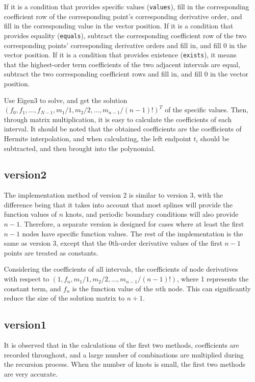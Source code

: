 \documentclass[a4paper]{article}
\begin{document}
If it is a condition that provides specific values (\texttt{values}), fill in the corresponding coefficient row of the corresponding point's corresponding derivative order, and fill in the corresponding value in the vector position. If it is a condition that provides equality (\texttt{equals}), subtract the corresponding coefficient row of the two corresponding points' corresponding derivative orders and fill in, and fill 0 in the vector position. If it is a condition that provides existence (\texttt{exists}), it means that the highest-order term coefficients of the two adjacent intervals are equal, subtract the two corresponding coefficient rows and fill in, and fill 0 in the vector position.

Use Eigen3 to solve, and get the solution \((f_0, f_1, \dots, f_{N-1}, m_1/1, m_2/2, \dots, m_{n-1}/(n-1)!)^T\) of the specific values. Then, through matrix multiplication, it is easy to calculate the coefficients of each interval. It should be noted that the obtained coefficients are the coefficients of Hermite interpolation, and when calculating, the left endpoint \(t_i\) should be subtracted, and then brought into the polynomial.

\subsection*{version2}

The implementation method of version 2 is similar to version 3, with the difference being that it takes into account that most splines will provide the function values of $n$ knots, and periodic boundary conditions will also provide $n-1$. Therefore, a separate version is designed for cases where at least the first $n-1$ nodes have specific function values. The rest of the implementation is the same as version 3, except that the 0th-order derivative values of the first $n-1$ points are treated as constants.

Considering the coefficients of all intervals, the coefficients of node derivatives with respect to $(1, f_n, m_1/1, m_2/2, \dots, m_{n-1}/(n-1)!)$, where 1 represents the constant term, and $f_n$ is the function value of the $n$th node. This can significantly reduce the size of the solution matrix to $n + 1$.

\subsection*{version1}

It is observed that in the calculations of the first two methods, coefficients are recorded throughout, and a large number of combinations are multiplied during the recursion process. When the number of knots is small, the first two methods are very accurate.
\end{document}
